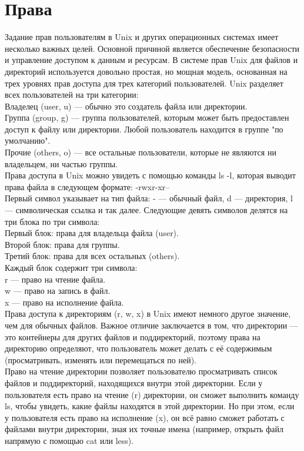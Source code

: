 \section{Права}
Задание прав пользователям в Unix и других операционных системах имеет несколько важных целей. Основной причиной является обеспечение безопасности и управление доступом к данным и ресурсам. В системе прав Unix для файлов и директорий используется довольно простая, но мощная модель, основанная на трех уровнях прав доступа для трех категорий пользователей. Unix разделяет всех пользователей на три категории: \\
Владелец (user, u) — обычно это создатель файла или директории. \\
Группа (group, g) — группа пользователей, которым может быть предоставлен доступ к файлу или директории. Любой пользователь находится в группе "по умолчанию". \\
Прочие (others, o) — все остальные пользователи, которые не являются ни владельцем, ни частью группы. \\
Права доступа в Unix можно увидеть с помощью команды ls -l, которая выводит права файла в следующем формате: -rwxr-xr-- \\
Первый символ указывает на тип файла: - — обычный файл, d — директория, l — символическая ссылка и так далее. Следующие девять символов делятся на три блока по три символа: \\
Первый блок: права для владельца файла (user). \\
Второй блок: права для группы. \\
Третий блок: права для всех остальных (others). \\
Каждый блок содержит три символа: \\
r — право на чтение файла. \\
w — право на запись в файл. \\
x — право на исполнение файла. \\
Права доступа к директориям (r, w, x) в Unix имеют немного другое значение, чем для обычных файлов. Важное отличие заключается в том, что директории — это контейнеры для других файлов и поддиректорий, поэтому права на директорию определяют, что пользователь может делать с её содержимым (просматривать, изменять или перемещаться по ней). \\
Право на чтение директории позволяет пользователю просматривать список файлов и поддиректорий, находящихся внутри этой директории. Если у пользователя есть право на чтение (r) директории, он сможет выполнить команду ls, чтобы увидеть, какие файлы находятся в этой директории. Но при этом, если у пользователя есть право на исполнение (x), он всё равно сможет работать с файлами внутри директории, зная их точные имена (например, открыть файл напрямую с помощью cat или less). \\
